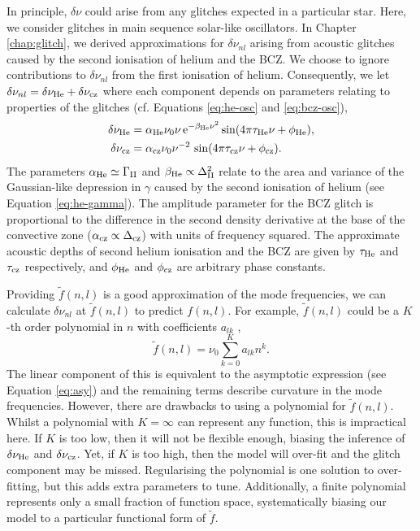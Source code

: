 In principle, \(\delta\nu\) could arise from any glitches expected in a particular star. Here, we consider glitches in main sequence solar-like oscillators. In Chapter \ref{chap:glitch}, we derived approximations for \(\delta\nu_{nl}\) arising from acoustic glitches caused by the second ionisation of helium and the BCZ. We choose to ignore contributions to \(\delta\nu_{nl}\) from the first ionisation of helium. Consequently, we let \(\delta\nu_{nl} = \delta\nu_{{\mathrm{He}}} + \delta\nu_{{\mathrm{cz}}}\) where each component depends on parameters relating to properties of the glitches (cf. Equations \ref{eq:he-osc} and \ref{eq:bcz-osc}),
%
\begin{align}
    \delta\nu_{{\mathrm{He}}} &= \alpha_{{\mathrm{He}}} \nu_0 \nu \, \mathrm{e}^{-\beta_{{\mathrm{He}}} \nu^2} \sin(4\pi\tau_{{\mathrm{He}}}\nu + \phi_{{\mathrm{He}}}), \label{eq:he-glitch}\\
    \delta\nu_{{\mathrm{cz}}} &= \alpha_{{\mathrm{cz}}} \nu_0 \nu^{-2} \, \sin(4\pi\tau_{{\mathrm{cz}}}\nu + \phi_{{\mathrm{cz}}}). \label{eq:bcz-glitch}
\end{align}
%
The parameters \(\alpha_{{\mathrm{He}}} \simeq \Gamma_{{\mathrm{II}}}\) and \(\beta_{{\mathrm{He}}} \propto \Delta_{{\mathrm{II}}}^2\) relate to the area and variance of the Gaussian-like depression in \(\gamma\) caused by the second ionisation of helium (see Equation \ref{eq:he-gamma}). The amplitude parameter for the BCZ glitch is proportional to the difference in the second density derivative at the base of the convective zone (\(\alpha_{{\mathrm{cz}}} \propto \Delta_{{\mathrm{cz}}}\)) with units of frequency squared. The approximate acoustic depths of second helium ionisation and the BCZ are given by \(\tau_{{\mathrm{He}}}\) and \(\tau_{{\mathrm{cz}}}\) respectively, and \(\phi_{{\mathrm{He}}}\) and \(\phi_{{\mathrm{cz}}}\) are arbitrary phase constants.

Providing \(\tilde{f}(n, l)\) is a good approximation of the mode frequencies, we can calculate \(\delta\nu_{nl}\) at \(\tilde{f}(n, l)\) to predict \(f(n, l)\). For example, \(\tilde{f}(n,l)\) could be a \(K\)-th order polynomial in \(n\) with coefficients \(a_{lk}\) \citep[e.g.][]{Kjeldsen.Bedding.ea2005,Ulrich1986},
%
\begin{equation}
    \tilde{f}(n, l) = \nu_0 \sum_{k=0}^{K} a_{lk} n^k. \label{eq:poly}
\end{equation}
%
The linear component of this is equivalent to the asymptotic expression (see Equation \ref{eq:asy}) and the remaining terms describe curvature in the mode frequencies. However, there are drawbacks to using a polynomial for \(\tilde{f}(n, l)\). Whilst a polynomial with \(K = \infty\) can represent any function, this is impractical here. If \(K\) is too low, then it will not be flexible enough, biasing the inference of \(\delta\nu_{{\mathrm{He}}}\) and \(\delta\nu_{{\mathrm{cz}}}\). Yet, if \(K\) is too high, then the model will over-fit and the glitch component may be missed. Regularising the polynomial is one solution to over-fitting, but this adds extra parameters to tune. Additionally, a finite polynomial represents only a small fraction of function space, systematically biasing our model to a particular functional form of \(\tilde{f}\).

